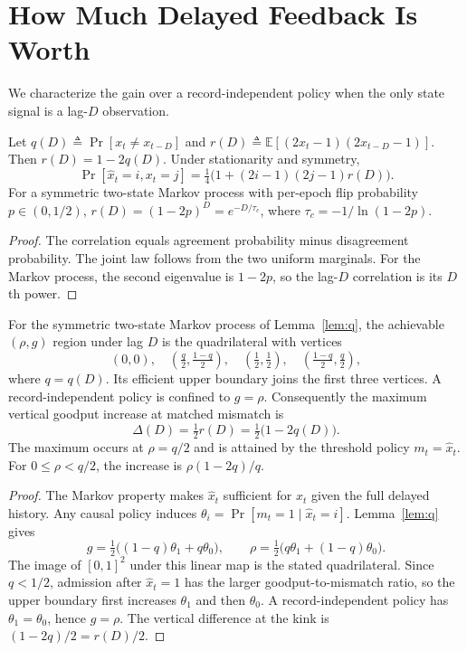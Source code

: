 \section{How Much Delayed Feedback Is Worth}
\label{sec:limit}

We characterize the gain over a record-independent policy when the only state
signal is a lag-$D$ observation.

\begin{lemma}\label{lem:q}
Let $q(D)\triangleq\Pr[x_t\neq x_{t-D}]$ and
$r(D)\triangleq\mathbb{E}[(2x_t-1)(2x_{t-D}-1)]$. Then
$r(D)=1-2q(D)$. Under stationarity and symmetry,
\[
\Pr[\hat x_t=i,x_t=j]
=\tfrac14\bigl(1+(2i-1)(2j-1)r(D)\bigr).
\]
For a symmetric two-state Markov process with per-epoch flip probability
$p\in(0,1/2)$,
$r(D)=(1-2p)^D=e^{-D/\tau_c}$, where
$\tau_c=-1/\ln(1-2p)$.
\end{lemma}
\begin{proof}
The correlation equals agreement probability minus disagreement probability.
The joint law follows from the two uniform marginals. For the Markov process, the
second eigenvalue is $1-2p$, so the lag-$D$ correlation is its $D$th power.
\end{proof}

\begin{theorem}\label{thm:limit}
For the symmetric two-state Markov process of Lemma~\ref{lem:q}, the achievable
$(\rho,g)$ region under lag $D$ is the quadrilateral with vertices
\[
(0,0),\quad
\left(\tfrac q2,\tfrac{1-q}{2}\right),\quad
\left(\tfrac12,\tfrac12\right),\quad
\left(\tfrac{1-q}{2},\tfrac q2\right),
\]
where $q=q(D)$. Its efficient upper boundary joins the first three vertices. A
record-independent policy is confined to $g=\rho$. Consequently the maximum
vertical goodput increase at matched mismatch is
\begin{equation}\label{eq:adv}
\Delta(D)=\tfrac12 r(D)=\tfrac12\bigl(1-2q(D)\bigr).
\end{equation}
The maximum occurs at $\rho=q/2$ and is attained by the threshold policy
$m_t=\hat x_t$. For $0\le\rho<q/2$, the increase is
$\rho(1-2q)/q$.
\end{theorem}
\begin{proof}
The Markov property makes $\hat x_t$ sufficient for $x_t$ given the full delayed
history. Any causal policy induces
$\theta_i=\Pr[m_t=1\mid\hat x_t=i]$. Lemma~\ref{lem:q} gives
\[
g=\tfrac12\bigl((1-q)\theta_1+q\theta_0\bigr),\qquad
\rho=\tfrac12\bigl(q\theta_1+(1-q)\theta_0\bigr).
\]
The image of $[0,1]^2$ under this linear map is the stated quadrilateral. Since
$q<1/2$, admission after $\hat x_t=1$ has the larger goodput-to-mismatch ratio,
so the upper boundary first increases $\theta_1$ and then $\theta_0$. A
record-independent policy has $\theta_1=\theta_0$, hence $g=\rho$. The vertical
difference at the kink is $(1-2q)/2=r(D)/2$.
\end{proof}


